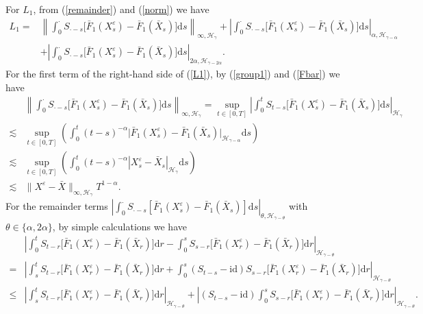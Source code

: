 \documentclass[10pt,a4paper]{article}
\numberwithin{equation}{section}
\begin{document}
For $L_1$, from (\ref{remainder}) and (\ref{norm}) we have
\begin{align}\label{L1}
L_1
=& \left\| \int_0^\cdot S_{\cdot-s} \big[\bar{F}_1(X_s^\varepsilon)-\bar{F}_1(\bar{X}_s) \big]\mathrm{d} s \right\|_{\infty,\mathcal H_\gamma}
+\left| \int_0^\cdot S_{\cdot-s} \big[\bar{F}_1(X_s^\varepsilon)-\bar{F}_1(\bar{X}_s) \big]\mathrm{d} s \right|_{\alpha,\mathcal H_{\gamma-\alpha}} \nonumber\\
&+\left| \int_0^\cdot S_{\cdot-s} \big[\bar{F}_1(X_s^\varepsilon)-\bar{F}_1(\bar{X}_s) \big]\mathrm{d} s \right|_{2\alpha,\mathcal H_{\gamma-2\alpha}}.
\end{align}
For the first term of the right-hand side of (\ref{L1}), by (\ref{group1}) and (\ref{Fbar}) we have
\begin{align} \label{barFsup}
&\left\| \int_0^\cdot S_{\cdot-s} \big[\bar{F}_1(X_s^\varepsilon)-\bar{F}_1(\bar{X}_s) \big]\mathrm{d} s \right\|_{\infty,\mathcal H_\gamma}
 =\sup_{t \in [0,T]}\left| \int_0^t S_{t-s}  \big[\bar{F}_1(X_s^\varepsilon)-\bar{F}_1(\bar{X}_s) \big]\mathrm{d} s \right|_{\mathcal H_\gamma } \nonumber \\
\lesssim & \sup_{t \in [0,T]} \left(\int_0^t (t-s)^{-\alpha} \big|\bar{F}_1(X_s^\varepsilon)-\bar{F}_1(\bar{X}_s) \big|_{\mathcal H_{\gamma-\alpha} } \mathrm{d} s  \right) \nonumber \\
\lesssim & \sup_{t \in [0,T]} \left( \int_0^t (t-s)^{-\alpha} |X_s^\varepsilon-\bar{X}_s|_{\mathcal H_\gamma } \mathrm{d} s \right)\nonumber \\
\lesssim &  \|X^\varepsilon-\bar{X}\|_{\infty,\mathcal H_\gamma} T^{1-\alpha}.
\end{align}
For the remainder terms $ \left| \int_0^\cdot S_{\cdot-s} [\bar{F}_1(X_s^\varepsilon)-\bar{F}_1(\bar{X}_s) ]  \mathrm{d} s \right|_{\theta,\mathcal H_{\gamma-\theta}}$ with $\theta \in {\{\alpha, 2\alpha\}}$,
by simple calculations we have
\begin{align*}
&\left|\int_0^t S_{t-r} \big[\bar{F}_1(X_r^\varepsilon)-\bar{F}_1(\bar{X}_r) \big] \mathrm{d} r-\int_0^s S_{s-r} \big[\bar{F}_1(X_r^\varepsilon)-\bar{F}_1(\bar{X}_r) \big] \mathrm{d} r \right|_{\mathcal H_{\gamma-\theta}}\\
=&\left| \int_s^t S_{t-r} \big[\bar{F}_1(X_r^\varepsilon)-\bar{F}_1(\bar{X}_r) \big] \mathrm{d} r+\int_0^s (S_{t-s}-\mathrm{id} )S_{s-r} \big[\bar{F}_1(X_r^\varepsilon)-\bar{F}_1(\bar{X}_r) \big] \mathrm{d} r \right|_{\mathcal H_{\gamma-\theta}}\\
\leq & \left|\int_s^t S_{t-r} \big[\bar{F}_1(X_r^\varepsilon)-\bar{F}_1(\bar{X}_r) \big] \mathrm{d} r \right|_{\mathcal H_{\gamma-\theta}}
+\left|(S_{t-s}-\mathrm{id} )\int_0^s S_{s-r} \big[\bar{F}_1(X_r^\varepsilon)-\bar{F}_1(\bar{X}_r) \big] \mathrm{d} r \right|_{\mathcal H_{\gamma-\theta}}.
\end{align*}
\end{document}
